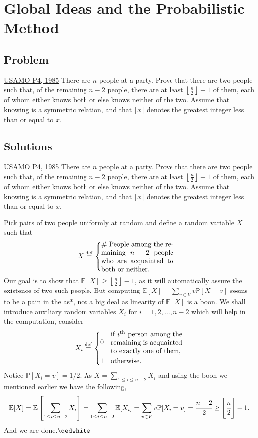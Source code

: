 \section{Global Ideas and the Probabilistic Method}
\subsection{Problem}
\begin{problem}{1}{\href{https://artofproblemsolving.com/community/c6h420397p34307872}{USAMO P4, 1985}}
	There are $n$ people at a party. Prove that there are two people such that, of the remaining $n-2$ people, there are at least $\left\lfloor\frac{n}{2}\right\rfloor-1$ of them, each of whom either knows both or else knows neither of the two. Assume that knowing is a symmetric relation, and that $\lfloor x\rfloor$ denotes the greatest integer less than or equal to $x$.
\end{problem}
	

\subsection{Solutions}
\begin{problem}{1}{\href{https://artofproblemsolving.com/community/c6h420397p34307872}{USAMO P4, 1985}}
	There are $n$ people at a party. Prove that there are two people such that, of the remaining $n-2$ people, there are at least $\left\lfloor\frac{n}{2}\right\rfloor-1$ of them, each of whom either knows both or else knows neither of the two. Assume that knowing is a symmetric relation, and that $\lfloor x\rfloor$ denotes the greatest integer less than or equal to $x$.
	\begin{solution} Pick pairs of two people uniformly at random and define a random variable $X$ such that
$$X\overset{\mathrm{def}}{=}
	\begin{cases}
		\parbox{.3\linewidth}{$\#$ People among the remaining $n-2$ people who are acquainted to both or neither.}\\[3ex]
	\end{cases}$$
	\indent Our goal is to show that $\mathbb{E}[X]\ge \left\lfloor\frac{n}{2}\right\rfloor-1$, as it will automatically assure the existence of two such people. But computing $\mathbb{E}[X]=\sum_{v\in V}v\mathbb{P}[X=v]$ seems to be a pain in the as*, not a big deal as linearity of $\mathbb{E}[X]$ is a boon. We shall introduce auxiliary random variables $X_i$ for $i=1,2,\ldots,n-2$ which will help in the computation, consider
$$X_i\overset{\mathrm{def}}{=}
\begin{cases}
	0 & \parbox{.3\linewidth}{if $i^{\text{th}}$ person among the remaining is acquainted to exactly one of them,}\\[3ex]
	1 & \text{otherwise.}
\end{cases}$$
	Notice $\mathbb{P}[X_i=v]=1/2$. As $\displaystyle X=\sum_{1\le i\le n-2}X_i$ and using the boon we mentioned earlier we have the following,
$$\mathbb{E}[X]=\mathbb{E}\left[\sum_{1\le i\le n-2}X_i\right]=\sum_{1\le i\le n-2}\mathbb{E}[X_i]=\sum_{v\in V}v\mathbb{P}[X_i=v]=\cfrac{n-2}{2}\ge \left\lfloor\cfrac{n}{2}\right\rfloor-1.$$And we are done.$\qedwhite$
	\end{solution}
\end{problem}
